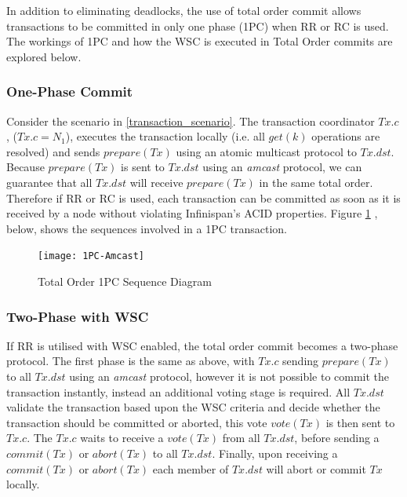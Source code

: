 	    In addition to eliminating deadlocks,  the use of total order commit allows transactions to be committed in only one phase (1PC) when RR or RC is used.  The workings of 1PC and how the WSC is executed in Total Order commits are explored below.  
	    
	        \subsubsection*{One-Phase Commit}
	        Consider the scenario in \ref{transaction_scenario}.  The transaction coordinator $Tx.c$, ($Tx.c = N_1$), executes the transaction locally (i.e. all $get(k)$ operations are resolved) and sends $prepare(Tx)$ using an atomic multicast protocol to $Tx.dst$.  Because $prepare(Tx)$ is sent to $Tx.dst$ using an \emph{amcast} protocol, we can guarantee that all $Tx.dst$ will receive $prepare(Tx)$ in the same total order.  Therefore if RR or RC is used, each transaction can be committed as soon as it is received by a node without violating Infinispan's ACID properties.  Figure \ref{fig:total_order_1PC} , below, shows the sequences involved in a 1PC transaction.  
	        
            \begin{figure}[htbp!] 
                \centering    
                \texttt{[image: 1PC-Amcast]}
                \caption[Total Order One-phase Commit Protocol]{Total Order 1PC Sequence Diagram}
                \label{fig:total_order_1PC}
            \end{figure}	        
	        
		        
			\subsubsection*{Two-Phase with WSC}      
	        If RR is utilised with WSC enabled, the total order commit becomes a two-phase protocol.  The first phase is the same as above, with $Tx.c$ sending $prepare(Tx)$ to all $Tx.dst$ using an \emph{amcast} protocol, however it is not possible to commit the transaction instantly, instead an additional voting stage is required.  All $Tx.dst$ validate the transaction based upon the WSC criteria and decide whether the transaction should be committed or aborted, this vote $vote(Tx)$ is then sent to $Tx.c$.  The $Tx.c$ waits to receive a $vote(Tx)$ from all $Tx.dst$, before sending a $commit(Tx)$ or $abort(Tx)$ to all $Tx.dst$.  Finally, upon receiving a $commit(Tx)$ or $abort(Tx)$ each member of $Tx.dst$ will abort or commit $Tx$ locally.          
	        
